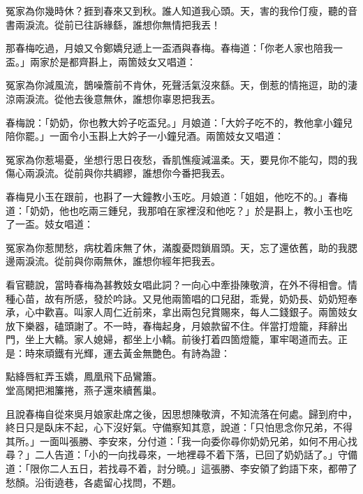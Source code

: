 \begin{myquote}
冤家為你幾時休？捱到春來又到秋。誰人知道我心頭。天，害的我伶仃瘦，聽的音書兩淚流。從前已往訴緣繇，誰想你無情把我丟！
\end{myquote}

那春梅吃過，月娘又令鄭嬌兒遞上一盃酒與春梅。春梅道：「你老人家也陪我一盃。」兩家於是都齊斟上，兩箇妓女又唱道：

\begin{myquote}
冤家為你減風流，鵲噪簷前不肯休，死聲活氣沒來繇。天，倒惹的情拖逗，助的淒涼兩淚流。從他去後意無休，誰想你辜恩把我丟。
\end{myquote}

春梅說：「奶奶，你也教大妗子吃盃兒。」月娘道：「大妗子吃不的，教他拿小鐘兒陪你罷。」一面令小玉斟上大妗子一小鐘兒酒。兩箇妓女又唱道：

\begin{myquote}
冤家為你惹場憂，坐想行思日夜愁，香肌憔瘦減溫柔。天，要見你不能勾，悶的我傷心兩淚流。從前與你共綢繆，誰想你今番把我丟。
\end{myquote}

春梅見小玉在跟前，也斟了一大鐘教小玉吃。{}月娘道：「姐姐，他吃不的。」春梅道：「奶奶，他也吃兩三鍾兒，我那咱在家裡沒和他吃？」{}於是斟上，教小玉也吃了一盃。妓女唱道：

\begin{myquote}
冤家為你惹閒愁，病枕着床無了休，滿腹憂悶鎖眉頭。天，忘了還依舊，助的我腮邊兩淚流。從前與你兩無休，誰想你經年把我丟。
\end{myquote}

看官聽說，當時春梅為甚教妓女唱此詞？一向心中牽掛陳敬濟，在外不得相會。情種心苗，故有所感，發於吟詠。又見他兩箇唱的口兒甜，乖覺，奶奶長、奶奶短奉承，心中歡喜。叫家人周仁近前來，拿出兩包兒賞賜來，每人二錢銀子。兩箇妓女放下樂器，磕頭謝了。不一時，春梅起身，月娘款留不住。伴當打燈籠，拜辭出門，坐上大轎。家人媳婦，都坐上小轎。前後打着四箇燈籠，軍牢喝道而去。正是：時來頑鐵有光輝，運去黃金無艷色。有詩為證：

\begin{myquote}
點絳唇紅弄玉嬌，鳳凰飛下品鸞簫。\\堂高閑把湘簾捲，燕子還來續舊巢。
\end{myquote}

且說春梅自從來吳月娘家赴席之後，因思想陳敬濟，不知流落在何處。{}歸到府中，終日只是臥床不起，心下沒好氣。守備察知其意，{}說道：「只怕思念你兄弟，不得其所。」一面叫張勝、李安來，分付道：「我一向委你尋你奶奶兄弟，如何不用心找尋？」二人告道：「小的一向找尋來，一地裡尋不着下落，已回了奶奶話了。」守備道：「限你二人五日，若找尋不着，討分曉。」這張勝、李安領了鈞語下來，都帶了愁顏。沿街遶巷，各處留心找問，不題。

